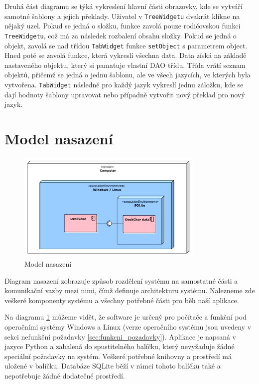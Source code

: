 \documentclass[thesis=B,czech]{resources/FITthesis}[2012/06/26]
\begin{document}
Druhá část diagramu se týká vykreslení hlavní části obrazovky, kde se vytváří samotné šablony a jejich překlady. Uživatel v \texttt{TreeWidgetu} dvakrát klikne na nějaký uzel. Pokud se jedná o složku, funkce zavolá pouze rodičovskou funkci \texttt{TreeWidgetu}, což má za následek rozbalení obsahu složky. Pokud se jedná o objekt, zavolá se nad třídou \texttt{TabWidget} funkce \texttt{setObject} s parametrem object. Hned poté se zavolá funkce, která vykreslí všechna data. Data získá na základě nastaveného objektu, který si pamatuje vlastní DAO třídu. Třída vrátí seznam objektů, přičemž se jedná o jednu šablonu, ale ve všech jazycích, ve kterých byla vytvořena. \texttt{TabWidget} následně pro každý jazyk vykreslí jednu záložku, kde se dají hodnoty šablony upravovat nebo případně vytvořit nový překlad pro nový jazyk.
	
	\section{Model nasazení}
	\begin{figure}\centering
	\includegraphics[width=0.8\textwidth]{images/model_nasazeni}
	\caption[Model nasazení]{Model nasazení}\label{fig:model_nasazeni}
	\end{figure}
Diagram nasazení zobrazuje způsob rozdělení systému na samostatné části a komunikační vazby mezi nimi, čímž definuje architekturu systému. Nalezneme zde veškeré komponenty systému a všechny potřebné části pro běh naší aplikace.\par

Na diagramu \ref{fig:model_nasazeni} můžeme vidět, že software je určený pro počítače a funkční pod operačními systémy Windows a Linux (verze operačního systému jsou uvedeny v sekci nefunkční požadavky \ref{sec:funkcni_pozadavky}). Aplikace je napsaná v jazyce Python a zabalená do spustitelného balíčku, který nevyžaduje žádné speciální požadavky na systém. Veškeré potřebné knihovny a prostředí má uložené v balíčku. Databáze SQLite běží v rámci tohoto balíčku také a nepotřebuje žádné dodatečné prostředí.
\end{document}
